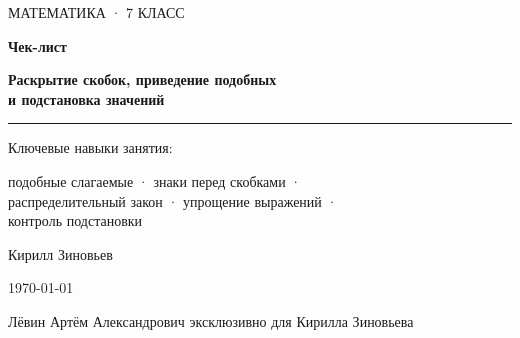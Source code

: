 \documentclass[a4paper,12pt]{article}
\newcommand{\topicline}{%
  \par
  \noindent
  \color{accent}%
  \rule{\linewidth}{0.6pt}%
  \color{black}%
  \par
}
\begin{document}

\begin{titlepage}
\thispagestyle{empty}

\begin{center}

\vspace*{1.8cm}

{\large\color{textgray}
МАТЕМАТИКА · 7 КЛАСС
\par}

\vspace{1.2cm}

{\Huge\bfseries\color{darkaccent}
Чек-лист
\par}

\vspace{0.45cm}

{\LARGE\bfseries
Раскрытие скобок, приведение подобных\\[0.15cm]
и подстановка значений
\par}

\vspace{1cm}

\topicline

\vspace{0.9cm}

{\large
Ключевые навыки занятия:
\par}

\vspace{0.3cm}

{\large
подобные слагаемые · знаки перед скобками ·\\
распределительный закон · упрощение выражений ·\\
контроль подстановки
\par}

\vfill

{\large
Кирилл Зиновьев
\par}

\vspace{0.35cm}

{\normalsize
\today
\par}

\vspace{1cm}

{\normalsize
Лёвин Артём Александрович эксклюзивно для Кирилла Зиновьева
\par}

\vspace{1.4cm}


\end{center}

\end{titlepage}
\end{document}
